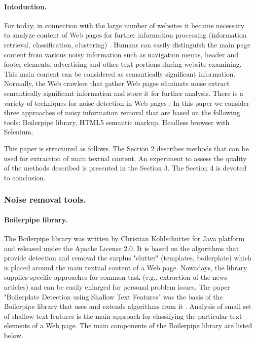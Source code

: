 \paragraph{Intoduction.} For today, in connection with the large number of websites it became necessary to analyze content of Web pages for further information processing (information retrieval, classification, clustering) \cite{Chakrabarti2}. Humans can easily distinguish the main page content from various noisy information such as navigation menus, header and footer elements, advertising and other text portions during website examining. This main content can be considered as semantically significant information. Normally, the Web crawlers that gather Web pages eliminate noise extract semantically significant information and store it for further analysis. There is a variety of techniques for noise detection in Web pages \cite{YiLiuLi}. In this paper we consider three approaches of noisy information removal that are based on the following tools: Boilerpipe library, HTML5 semantic markup, Headless browser with Selenium.

This paper is structured as follows. The Section 2 describes methods that can be used for extraction of main textual content. An experiment to assess the quality of the methods described is presented in the Section 3. The Section 4 is devoted to conclusion.

\subsubsection{Noise removal tools.}

\paragraph{Boilerpipe library.} The Boilerpipe library was written by Christian Kohlschutter for Java platform and released under the Apache License 2.0. It is based on the algorithms that provide detection and removal the surplus "clutter" (templates, boilerplate) which is placed around the main textual content of a Web page. Nowadays, the library supplies specific approaches for common task (e.g., extraction of the news articles) and can be easily enlarged for personal problem issues. The paper "Boilerplate Detection using Shallow Text Features" was the basis of the Boilerpipe library that uses and extends algorithms from it \cite{KohlschutterFankhauserNejdl}. Analysis of small set of shallow text features is the main approach for classifying the particular text elements of a Web page. The main components of the Boilerpipe library are listed below.

